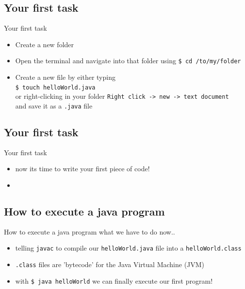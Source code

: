 \subsection{Your first task}
\begin{frame}[fragile]{Your first task}
	\begin{itemize}[<+->]
		\item Create a new folder
		\item Open the terminal and navigate into that folder using \lstinline[columns=fixed]{$ cd /to/my/folder}
		\item Create a new file by either typing\\ \lstinline[columns=fixed]{$ touch helloWorld.java}\\
		      or right-clicking in your folder \lstinline[columns=fixed]{Right click -> new -> text document}\\
		      and save it as a \lstinline[columns=fixed]{.java} file
	\end{itemize}
\end{frame}

\subsection{Your first task}
\begin{frame}[fragile]{Your first task}
	\begin{itemize}[<+->]
		\item now its time to write your first piece of code!
		\item[] 
	\end{itemize}
\end{frame}

\subsection{How to execute a java program}
\begin{frame}[fragile]{How to execute a java program}
	what we have to do now..
	\begin{itemize}[<+->]
		\item telling \lstinline[columns=fixed]{javac} to compile our \lstinline[columns=fixed]{helloWorld.java} file into a \lstinline[columns=fixed]{helloWorld.class}
		\item \lstinline[columns=fixed]{.class} files are 'bytecode' for the Java Virtual Machine (JVM)
		\item with \lstinline[columns=fixed]{$ java helloWorld} we can finally execute our first program!
	\end{itemize}
\end{frame}

